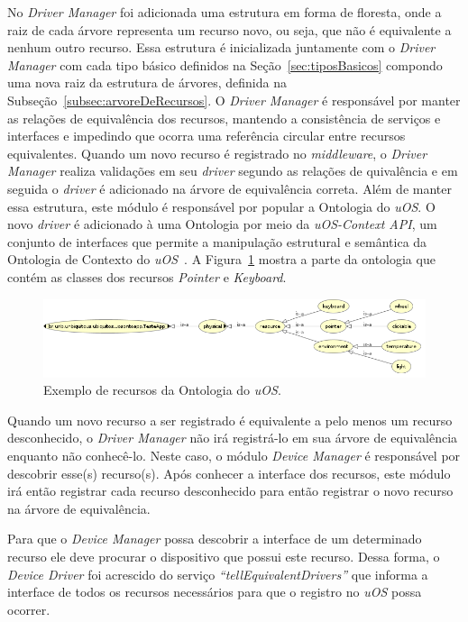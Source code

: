 No \emph{Driver Manager} foi adicionada uma estrutura em forma de floresta, onde a raiz de cada árvore representa um recurso novo, ou seja, que não é equivalente a nenhum outro recurso. Essa estrutura é inicializada juntamente com o \emph{Driver Manager} com cada tipo básico definidos na Seção~\ref{sec:tiposBasicos} compondo uma nova raiz da estrutura de árvores, definida na Subseção~\ref{subsec:arvoreDeRecursos}. O \emph{Driver Manager} é responsável por manter as relações de equivalência dos recursos, mantendo a consistência de serviços e interfaces e impedindo que ocorra uma referência circular entre recursos equivalentes. Quando um novo recurso é registrado no \emph{middleware}, o \emph{Driver Manager} realiza validações em seu \emph{driver} segundo as relações de quivalência e em seguida o \emph{driver} é adicionado na árvore de equivalência correta. Além de manter essa estrutura, este módulo é responsável por popular a Ontologia do \emph{uOS}. O novo \emph{driver} é adicionado à uma Ontologia por meio da \emph{uOS-Context API}, um conjunto de interfaces que permite a manipulação estrutural e semântica da Ontologia de Contexto do \emph{uOS}~\cite{ozakisbcup2011}. A Figura~\ref{fig:ontologiaUOS} mostra a parte da ontologia que contém as classes dos recursos \emph{Pointer} e \emph{Keyboard}.

\begin{figure}[ht]
	\center
	\includegraphics[scale=0.55]{imagens/ontologia}
	\caption{Exemplo de recursos da Ontologia do \emph{uOS}.}
	\label{fig:ontologiaUOS}
\end{figure}

Quando um novo recurso a ser registrado é equivalente a pelo menos um recurso desconhecido, o \emph{Driver Manager} não irá registrá-lo em sua árvore de equivalência enquanto não conhecê-lo. Neste caso, o módulo \emph{Device Manager} é responsável por descobrir esse(s) recurso(s). Após conhecer a interface dos recursos, este módulo irá então registrar cada recurso desconhecido para então registrar o novo recurso na árvore de equivalência.

Para que o \emph{Device Manager} possa descobrir a interface de um determinado recurso ele deve procurar o dispositivo que possui este recurso. Dessa forma, o \emph{Device Driver} foi acrescido do serviço \emph{``tellEquivalentDrivers''} que informa a interface de todos os recursos necessários para que o registro no \emph{uOS} possa ocorrer.